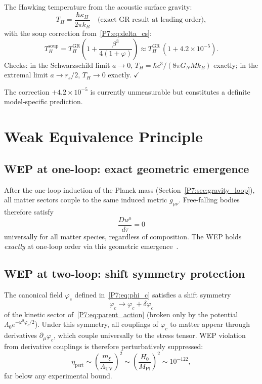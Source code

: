 \documentclass[11pt,a4paper]{article}
\theoremstyle{definition}
\theoremstyle{remark}
\newcommand{\vp}{\varphi}
\newcommand{\MPl}{M_{\mathrm{Pl}}}
\newcommand{\LUV}{\Lambda_{\mathrm{UV}}}
\begin{document}
The Hawking temperature from the acoustic surface gravity:
\begin{equation}
  T_H = \frac{\hbar\kappa_H}{2\pi k_B}
  \quad\text{(exact GR result at leading order)},
  \label{P7:eq:TH}
\end{equation}
with the soup correction from~\eqref{P7:eq:delta_cs}:
\begin{equation}
  \boxed{T_H^{\mathrm{soup}} = T_H^{\mathrm{GR}}\!\left(1 + \frac{\beta^3}{4(1+\vp)}\right)
  \approx T_H^{\mathrm{GR}}\,(1+4.2\times10^{-5}).}
  \label{P7:eq:TH_correction}
\end{equation}
Checks: in the Schwarzschild limit $a\to0$,
$T_H=\hbar c^3/(8\pi G_N M k_B)$ exactly; in the extremal limit
$a\to r_s/2$, $T_H\to0$ exactly. $\checkmark$

The correction $+4.2\times10^{-5}$ is currently unmeasurable but
constitutes a definite model-specific prediction.

\section{Weak Equivalence Principle}
\label{P7:sec:wep}

\subsection{WEP at one-loop: exact geometric emergence}

After the one-loop induction of the Planck mass (Section~\ref{P7:sec:gravity_loop}),
all matter sectors couple to the same induced metric $g_{\mu\nu}$.
Free-falling bodies therefore satisfy
\begin{equation}
  \frac{Du^\mu}{d\tau} = 0
\end{equation}
universally for all matter species, regardless of composition.
The WEP holds \emph{exactly} at one-loop order via this geometric
emergence~\cite{Jacobson1995}.

\subsection{WEP at two-loop: shift symmetry protection}

The canonical field $\varphi_c$ defined in~\eqref{P7:eq:phi_c} satisfies
a shift symmetry
\begin{equation}
  \varphi_c \to \varphi_c + \delta\varphi_c
  \label{P7:eq:shift}
\end{equation}
of the kinetic sector of~\eqref{P7:eq:parent_action} (broken only by the
potential $\Lambda_0 e^{-\vp^9\varphi_c/2}$).
Under this symmetry, all couplings of $\varphi_c$ to matter
appear through derivatives $\partial_\mu\varphi_c$, which couple
universally to the stress tensor.  WEP violation from derivative
couplings is therefore perturbatively suppressed:
\begin{equation}
  \eta_{\mathrm{pert}} \sim
  \left(\frac{m_\xi}{\LUV}\right)^2
  \sim \left(\frac{H_0}{\MPl}\right)^2
  \sim 10^{-122},
  \label{P7:eq:eta_pert}
\end{equation}
far below any experimental bound.
\end{document}

